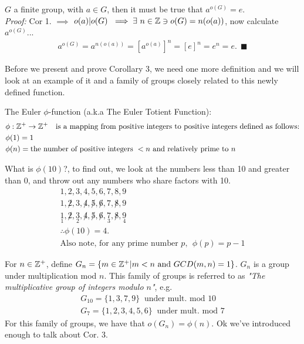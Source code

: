 \setcounter{dummy_lemma}{0}
\begin{corollary}
$G$ a finite group, with $a\in G$, then it must be true that $a^{o(G)}=e$.\\
\textit{Proof:} Cor 1. $\implies$ $o(a)|o(G) \ \implies \exists \ n\in {\mathbb{Z}} \ni o(G)=n(o(a))$, now
calculate $a^{o(G)}$...
\begin{align}
    a^{o(G)}=a^{n(o(a))}=[a^{o(a)}]^n=[e]^n=e^n=e. \ \ \blacksquare \nonumber
\end{align}
\end{corollary}
Before we present and prove Corollary 3, we need one more definition and we will look at an example
of it and a family of groups closely related to this newly defined function.
\begin{definition}
The Euler $\phi$-function (a.k.a The Euler Totient Function):\\
\begin{align}
    &\phi : {\mathbb{Z}}^+\rightarrow {\mathbb{Z}}^+ \ \ \text{ is a mapping from positive integers to positive integers defined as follows:}\nonumber \\
    &\phi(1)=1 \nonumber \\
    &\phi(n)=\text{the number of positive integers }<n\text{ and relatively prime to }n \nonumber
\end{align}
\end{definition}

\begin{example}
What is $\phi(10)$?, to find out, we look at the numbers less than 10 and greater than 0, and throw
out any numbers who share factors with 10.
\begin{align}
1,2,3,4,5,6,7,8,9 \nonumber \\
1,\not 2, 3,\not 4, \not 5, \not 6,7,\not 8, 9 \nonumber \\
\underset{1}{1},\not 2, \underset{2}{3},\not 4, \not 5, \not 6,\underset{3}{7},\not 8, \underset{4}{9} \nonumber \\
\therefore \phi(10)=4. \nonumber \\
\text{Also note, for any prime number }p, \ \ \phi(p)=p-1 \nonumber
\end{align}
\end{example}

\begin{example}
For $n\in {\mathbb{Z}}^+$, define $G_n=\{m\in {\mathbb{Z}}^+ | m<n \text{ and } GCD(m,n)=1\}$. $G_n$ is a group under
multiplication mod $n$. This family of groups is referred to as \textit{"The multiplicative group of
integers modulo $n$"}, e.g.
\begin{align}
    G_{10}= \{1,3,7,9\} \ \text{ under mult. mod }10 \nonumber \\
    G_{7}= \{1,2,3,4,5,6\} \ \text{ under mult. mod }7 \nonumber
\end{align}
For this family of groups, we have that $o(G_n)=\phi(n)$. Ok we've introduced enough to talk about
Cor. 3.
\end{example}

